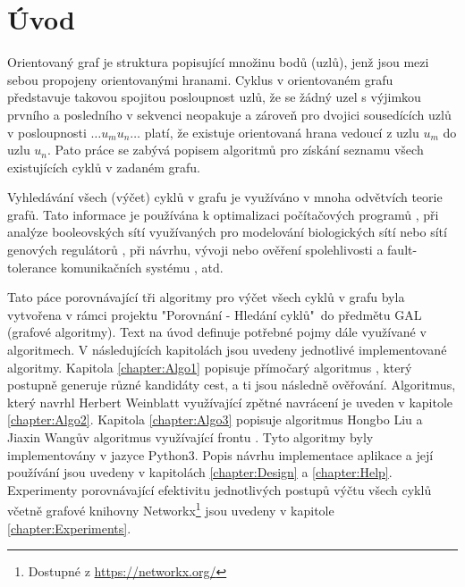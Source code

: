 
\chapter{Úvod}
    Orientovaný graf je struktura popisující množinu bodů (uzlů), jenž jsou mezi sebou propojeny orientovanými hranami. Cyklus v orientovaném grafu představuje takovou spojitou posloupnost uzlů, že se žádný uzel s výjimkou prvního a posledního v sekvenci neopakuje a zároveň pro dvojici sousedících uzlů v posloupnosti $\dots u_m u_n \dots$ platí, že existuje orientovaná hrana vedoucí z uzlu $u_m$ do uzlu $u_n$. Pato práce se zabývá popisem algoritmů pro získání seznamu všech existujících cyklů v zadaném grafu.

    Vyhledávání všech (výčet) cyklů v grafu je využíváno v mnoha odvětvích teorie grafů. Tato informace je používána k optimalizaci počítačových programů \cite{Program_optimization}, při analýze booleovských sítí využívaných pro modelování biologických sítí nebo sítí genových regulátorů \cite{Biology}, při návrhu, vývoji \cite{How_loopy_is_your_network} nebo ověření spolehlivosti a fault-tolerance komunikačních systému \cite{Network_Reliability}, atd.

    Tato páce porovnávající tři algoritmy pro výčet všech cyklů v grafu byla vytvořena v rámci projektu "Porovnání - Hledání cyklů"~do předmětu GAL (grafové algoritmy). Text na úvod definuje potřebné pojmy dále využívané v algoritmech. V následujících kapitolách jsou uvedeny jednotlivé implementované algoritmy. Kapitola \ref{chapter:Algo1} popisuje přímočarý algoritmus \cite[str. 287]{Book_algo}, který postupně generuje různé kandidáty cest, a ti jsou následně ověřování. Algoritmus, který navrhl Herbert Weinblatt využívající zpětné navrácení \cite{A_new_search_algorithm} je uveden v kapitole \ref{chapter:Algo2}. Kapitola \ref{chapter:Algo3} popisuje algoritmus Hongbo Liu a Jiaxin Wangův algoritmus využívající frontu \cite{A_new_way_to_enumerate_cycles_in_graph}. Tyto algoritmy byly implementovány v jazyce Python3. Popis návrhu implementace aplikace a její používání jsou uvedeny v kapitolách \ref{chapter:Design} a \ref{chapter:Help}. Experimenty porovnávající efektivitu jednotlivých postupů výčtu všech cyklů včetně grafové knihovny Networkx\footnote{Dostupné z \url{https://networkx.org/}} jsou uvedeny v kapitole \ref{chapter:Experiments}.

